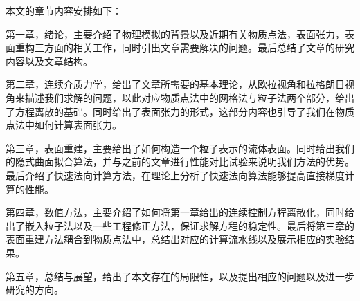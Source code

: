 本文的章节内容安排如下：

    第一章，绪论，主要介绍了物理模拟的背景以及近期有关物质点法，表面张力，表面重构三方面的相关工作，同时引出文章需要解决的问题。最后总结了文章的研究内容以及文章结构。

    第二章，连续介质力学，给出了文章所需要的基本理论，从欧拉视角和拉格朗日视角来描述我们求解的问题，以此对应物质点法中的网格法与粒子法两个部分，给出了方程离散的基础。同时给出了表面张力的形式，这部分内容也引导了我们在物质点法中如何计算表面张力。

    第三章，表面重建，主要给出了如何构造一个粒子表示的流体表面。同时给出我们的隐式曲面拟合算法，并与之前的文章进行性能对比试验来说明我们方法的优势。最后介绍了快速法向计算方法，在理论上分析了快速法向算法能够提高直接梯度计算的性能。

    第四章，数值方法，主要介绍了如何将第一章给出的连续控制方程离散化，同时给出了嵌入粒子法以及一些工程修正方法，保证求解方程的稳定性。最后将第三章的表面重建方法耦合到物质点法中，总结出对应的计算流水线以及展示相应的实验结果。

    第五章，总结与展望，给出了本文存在的局限性，以及提出相应的问题以及进一步研究的方向。
